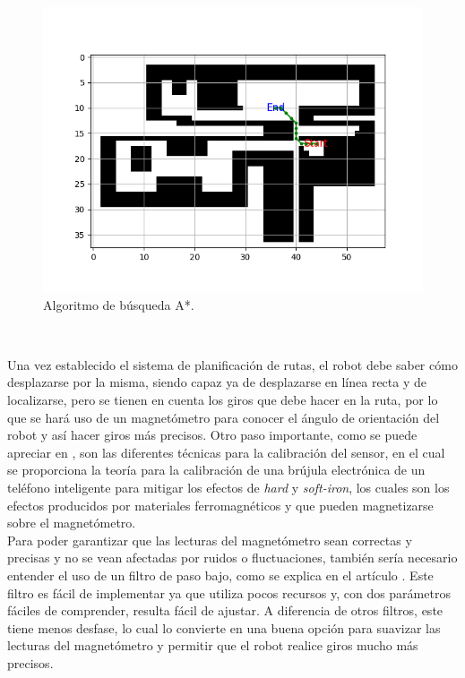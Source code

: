 \begin{figure} [H]
  \begin{center}
    \includegraphics[scale=0.4]{figs/astar}
  \end{center}
  \caption{Algoritmo de búsqueda A*.}
  \label{fig:astar}
\end{figure}\

Una vez establecido el sistema de planificación de rutas, el robot debe saber cómo desplazarse por la misma, siendo capaz ya de desplazarse en línea recta y de localizarse, pero se tienen en cuenta los giros que debe hacer en la ruta, por lo que se hará uso de un magnetómetro para conocer el ángulo de orientación del robot y así hacer giros más precisos. Otro paso importante, como se puede apreciar en \cite{Ozyagcilar2015}, son las diferentes técnicas para la calibración del sensor, en el cual se proporciona la teoría para la calibración de una brújula electrónica de un teléfono inteligente para mitigar los efectos de \textit{hard} y \textit{soft-iron}, los cuales son los efectos producidos por materiales ferromagnéticos y que pueden magnetizarse sobre el magnetómetro.\\

Para poder garantizar que las lecturas del magnetómetro sean correctas y precisas y no se vean afectadas por ruidos o fluctuaciones, también sería necesario entender el uso de un filtro de paso bajo, como se explica en el artículo \cite{low_pass_filter}. Este filtro es fácil de implementar ya que utiliza pocos recursos y, con dos parámetros fáciles de comprender, resulta fácil de ajustar. A diferencia de otros filtros, este tiene menos desfase, lo cual lo convierte en una buena opción para suavizar las lecturas del magnetómetro y permitir que el robot realice giros mucho más precisos.\\

